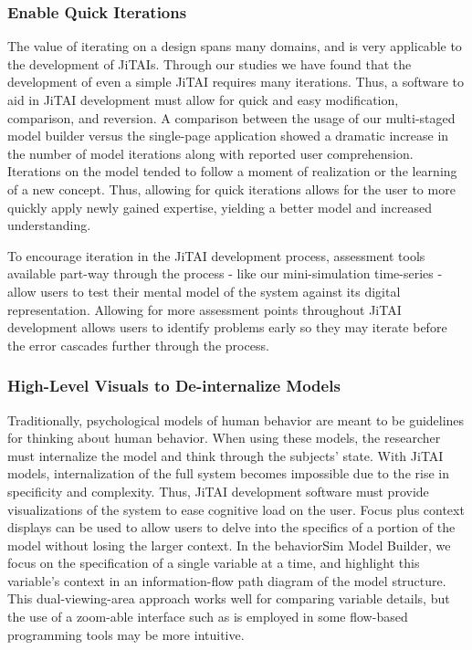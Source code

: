 \documentclass{sigchi}
\begin{document}
\subsubsection{Enable Quick Iterations}
The value of iterating on a design spans many domains, and is very applicable to the development of JiTAIs. 
Through our studies we have found that the development of even a simple JiTAI requires many iterations.
Thus, a software to aid in JiTAI development must allow for quick and easy modification, comparison, and reversion.
A comparison between the usage of our multi-staged model builder versus the single-page application showed a dramatic increase in the number of model iterations along with reported user comprehension.
Iterations on the model tended to follow a moment of realization or the learning of a new concept.
Thus, allowing for quick iterations allows for the user to more quickly apply newly gained expertise, yielding a better model and increased understanding.

To encourage iteration in the JiTAI development process, assessment tools available part-way through the process - like our mini-simulation time-series - allow users to test their mental model of the system against its digital representation.
Allowing for more assessment points throughout JiTAI development allows users to identify problems early so they may iterate before the error cascades further through the process.

\subsubsection{High-Level Visuals to De-internalize Models}
Traditionally, psychological models of human behavior are meant to be guidelines for thinking about human behavior.
When using these models, the researcher must internalize the model and think through the subjects' state.
With JiTAI models, internalization of the full system becomes impossible due to the rise in specificity and complexity.
Thus, JiTAI development software must provide visualizations of the system to ease cognitive load on the user.
Focus plus context displays \cite{baudisch2001focus} can be used to allow users to delve into the specifics of a portion of the model without losing the larger context. 
In the behaviorSim Model Builder, we focus on the specification of a single variable at a time, and highlight this variable’s context in an information-flow path diagram of the model structure.
This dual-viewing-area approach works well for comparing variable details, but the use of a zoom-able interface such as is employed in some flow-based programming \cite{morrison2010flow} tools may be more intuitive.
\end{document}
